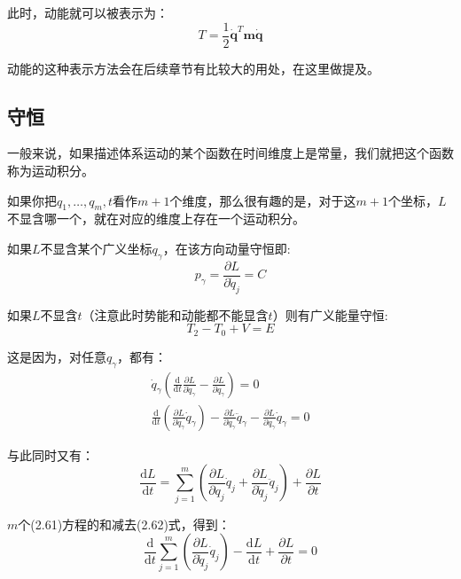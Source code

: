 \documentclass[a4paper, 10pt, openany]{book}%
\begin{document}
此时，动能就可以被表示为：
\begin{equation}
T=\frac{1}{2}\dot{\textbf{q}}^T\textbf{m}\dot{\textbf{q}}
\end{equation}

动能的这种表示方法会在后续章节有比较大的用处，在这里做提及。
\subsection{守恒}

一般来说，如果描述体系运动的某个函数在时间维度上是常量，我们就把这个函数称为运动积分。

如果你把$q_1,\dots,q_m,t$看作$m+1$个维度，那么很有趣的是，对于这$m+1$个坐标，$L$不显含哪一个，就在对应的维度上存在一个运动积分。

   如果$L$不显含某个广义坐标$q_\gamma$，在该方向动量守恒即:
    \begin{equation} p_\gamma=\frac{\partial L}{\partial \dot{q}_j}=C\end{equation}
    
    如果$L$不显含$t$（注意此时势能和动能都不能显含$t$）则有广义能量守恒:
    \begin{equation}T_2-T_0+V=E\end{equation}
    
    这是因为，对任意$q_\gamma$，都有：
    \begin{align}
    \dot{q}_\gamma(\frac{\mathrm{d}}{\mathrm{d}t}\frac{\partial L}{\partial \dot{q}_\gamma}-\frac{\partial L}{\partial q_\gamma})=0\\
    \frac{\mathrm{d}}{\mathrm{d}t}\left(\frac{\partial L}{\partial \dot{q}_\gamma}\dot{q}_\gamma\right)-\frac{\partial L}{\partial \dot{q}_\gamma}\ddot{q}_\gamma-\frac{\partial L}{\partial q_\gamma}\dot{q}_\gamma=0
    \end{align}
    
    与此同时又有：
    \begin{equation}
    \frac{\mathrm{d}L}{\mathrm{d}t}=\sum_{j=1}^m\left(\frac{\partial L}{\partial q_j}\dot{q}_j+\frac{\partial L}{\partial \dot{q}_j}\ddot{q}_j\right)+\frac{\partial L}{\partial t}
    \end{equation}

    $m$个(2.61)方程的和减去(2.62)式，得到：
    \begin{equation}
    \frac{\mathrm{d}}{\mathrm{d}t}\sum_{j=1}^m\left(\frac{\partial L}{\partial \dot{q}_j}\dot{q}_j\right)-\frac{\mathrm{d}L}{\mathrm{d}t}+\frac{\partial L}{\partial t}=0
    \end{equation}
\end{document}
